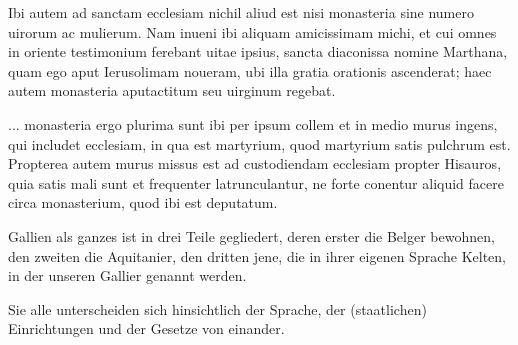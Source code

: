 \documentclass[a5paper]{article}
\begin{document}
\setlength{\columnrulewidth}{0.5pt}
\setlength{\Lcolwidth}{0.425\textwidth}
\setlength{\Rcolwidth}{0.425\textwidth}

\begin{pages}
\begin{Leftside}
\beginnumbering
\autopar
{}\itshape

Ibi autem ad sanctam ecclesiam nichil aliud est nisi monasteria sine numero uirorum ac mulierum. Nam inueni ibi aliquam amicissimam michi, et cui omnes in oriente testimonium ferebant uitae ipsius, sancta diaconissa nomine Marthana, quam ego aput Ierusolimam noueram, ubi illa gratia orationis ascenderat; haec autem monasteria aputactitum seu uirginum regebat.
\pend

\autopar

... monasteria ergo plurima sunt ibi per ipsum collem et in medio murus ingens, qui includet ecclesiam, in qua est martyrium, quod martyrium satis pulchrum est. Propterea autem murus missus est ad custodiendam ecclesiam propter Hisauros, quia satis mali sunt et frequenter latrunculantur, ne forte conentur aliquid facere circa monasterium, quod ibi est deputatum.

\endnumbering
\end{Leftside}

\begin{Rightside}
\beginnumbering

Gallien als ganzes ist in drei Teile gegliedert,
    deren erster die Belger bewohnen,
    den zweiten die Aquitanier,
    den dritten jene, die in ihrer eigenen Sprache Kelten, in der unseren Gallier genannt werden.
\pend

\autopar

Sie alle unterscheiden sich hinsichtlich der Sprache, 
    der (staatlichen) Einrichtungen und der Gesetze von einander.
    
\endnumbering
\end{Rightside}
\end{pages}

\Pages
\end{document}
